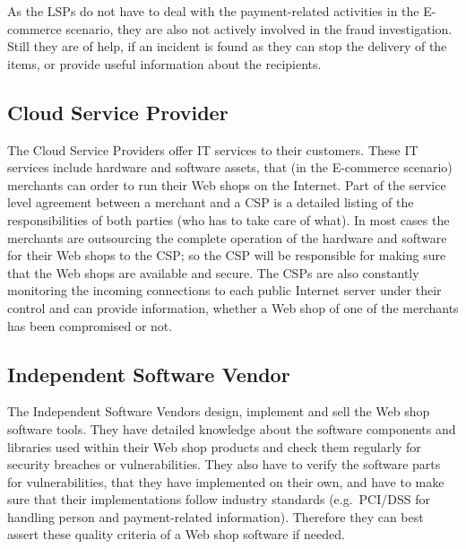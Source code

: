 As the \gls{LSP}s do not have to deal with the payment-related activities in the \gls{E-commerce} scenario, they are also not actively involved in the fraud investigation. Still they are of help, if an incident is found as they can stop the delivery of the items, or provide useful information about the recipients.


\subsection{Cloud Service Provider}
\label{subsec:stakeholder_csp}

The Cloud Service Providers offer \gls{IT} services to their customers. These \gls{IT} services include hardware and software assets, that (in the \gls{E-commerce} scenario) merchants can order to run their Web shops on the Internet. Part of the service level agreement between a merchant and a \gls{CSP} is a detailed listing of the responsibilities of both parties (who has to take care of what). In most cases the merchants are outsourcing the complete operation of the hardware and software for their Web shops to the \gls{CSP}; so the \gls{CSP} will be responsible for making sure that the Web shops are available and secure. The \gls{CSP}s are also constantly monitoring the incoming connections to each public Internet server under their control and can provide information, whether a Web shop of one of the merchants has been compromised or not.


\subsection{Independent Software Vendor}
\label{subsec:stakeholder_isv}

The Independent Software Vendors design, implement and sell the Web shop software tools. They have detailed knowledge about the software components and libraries used within their Web shop products and check them regularly for security breaches or vulnerabilities. They also have to verify the software parts for vulnerabilities, that they have implemented on their own, and have to make sure that their implementations follow industry standards (e.g.\ \gls{PCI/DSS} for handling person and payment-related information). Therefore they can best assert these quality criteria of a Web shop software if needed.


